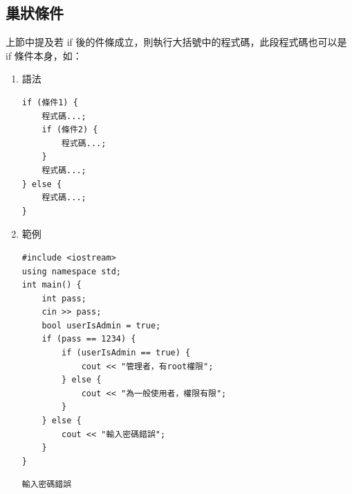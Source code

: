\documentclass[a4paper,12pt]{article}
\begin{document}
\subsection{巢狀條件}
\label{sec:org784a727}
上節中提及若 if 後的件條成立，則執行大括號中的程式碼，此段程式碼也可以是 if 條件本身，如：\\
\begin{enumerate}
\item 語法
\label{sec:org470b48a}
\lstset{breaklines=true,language=cpp,label= ,caption= ,captionpos=b,numbers=none}
\begin{lstlisting}
if (條件1) {
    程式碼...;
    if (條件2) {
        程式碼...;
    }
    程式碼...;
} else {
    程式碼...;
}
\end{lstlisting}
\item 範例
\label{sec:org08f3740}
\lstset{breaklines=true,language=cpp,label= ,caption= ,captionpos=b,firstnumber=1,numbers=left}
\begin{lstlisting}
#include <iostream>
using namespace std;
int main() {
    int pass;
    cin >> pass;
    bool userIsAdmin = true;
    if (pass == 1234) {
        if (userIsAdmin == true) {
            cout << "管理者，有root權限";
        } else {
            cout << "為一般使用者，權限有限";
        }
    } else {
        cout << "輸入密碼錯誤";
    }
}
\end{lstlisting}

\begin{verbatim}
輸入密碼錯誤
\end{verbatim}


\end{enumerate}
\end{document}
